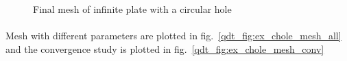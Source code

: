 \begin{figure}
    \centering
    \caption[Final mesh of infinite plate with a circular hole]{Final mesh of infinite plate with a circular hole}
    \label{qdt_fig:ex_chole_mesh_final}
\end{figure}
\paragraph{}
Mesh with different parameters are plotted in fig.~\ref{qdt_fig:ex_chole_mesh_all} and the convergence study is plotted in fig.~\ref{qdt_fig:ex_chole_mesh_conv}

